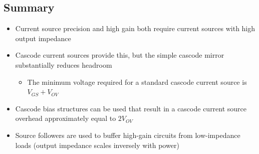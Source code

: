 \documentclass[11pt]{article}
\providecommand{\tightlist}{%
      \setlength{\itemsep}{0pt}\setlength{\parskip}{0pt}}
\begin{document}
    \hypertarget{summary}{%
\subsection{Summary}\label{summary}}

    \begin{itemize}
\item
  Current source precision and high gain both require current sources
  with high output impedance
\item
  Cascode current sources provide this, but the simple cascode mirror
  substantially reduces headroom

  \begin{itemize}
  \tightlist
  \item
    The minimum voltage required for a standard cascode current source
    is \(V_{GS} + V_{OV}\)
  \end{itemize}
\item
  Cascode bias structures can be used that result in a cascode current
  source overhead approximately equal to \(2V_{OV}\)
\item
  Source followers are used to buffer high-gain circuits from
  low-impedance loads (output impedance scales inversely with power)
\end{itemize}


    
    
    
\end{document}

